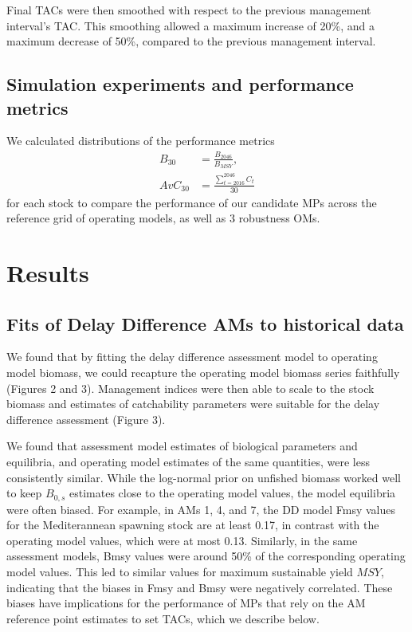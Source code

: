 \documentclass[]{article}
\begin{document}
Final TACs were then smoothed with respect to the previous management
interval's TAC. This smoothing allowed a maximum increase of 20\%, and
a maximum decrease of 50\%, compared to the previous management interval.

\hypertarget{simulation-experiments-and-performance-metrics}{%
\subsection{Simulation experiments and performance metrics}\label{simulation-experiments-and-performance-metrics}}

We calculated distributions of the performance metrics
\begin{align}
B_{30} &= \frac{B_{2046}}{B_{MSY}}, \\
AvC_{30} &= \frac{\sum_{t = 2016}^{2046} C_t}{30}
\end{align}
for each stock to compare the performance of our candidate MPs across
the reference grid of operating models, as well as 3 robustness OMs.

\hypertarget{results}{%
\section{Results}\label{results}}

\hypertarget{fits-of-delay-difference-ams-to-historical-data}{%
\subsection{Fits of Delay Difference AMs to historical data}\label{fits-of-delay-difference-ams-to-historical-data}}

We found that by fitting the delay difference assessment model to operating
model biomass, we could recapture the operating model biomass series
faithfully (Figures 2 and 3). Management indices were then able to scale
to the stock biomass and estimates of catchability parameters were suitable
for the delay difference assessment (Figure 3).

We found that assessment model estimates of biological parameters
and equilibria, and operating model estimates of the same quantities, were
less consistently similar. While the log-normal prior on unfished biomass
worked well to keep \(B_{0,s}\) estimates close to the operating model values,
the model equilibria were often biased. For example, in AMs 1, 4, and 7, the
DD model Fmsy values for the Mediterannean spawning stock are at least 0.17,
in contrast with the operating model values, which were at most 0.13. Similarly,
in the same assessment models, Bmsy values were around 50\% of the corresponding
operating model values. This led to similar values for maximum sustainable
yield \(MSY\), indicating that the biases in Fmsy and Bmsy were negatively correlated.
These biases have implications for the performance of MPs that rely on the
AM reference point estimates to set TACs, which we describe below.
\end{document}
